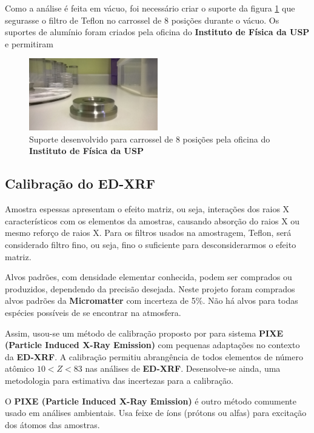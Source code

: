 Como a análise é feita em vácuo, foi necessário criar o suporte 
da figura \ref{fig:suporte8} que segurasse o filtro de Teflon no 
carrossel de 8 posições durante o vácuo. 
Os suportes de alumínio foram criados pela oficina do \textbf{Instituto de
Física da USP} e permitiram 

\begin{figure}[H]
\begin{center}
  \includegraphics[width=0.5\textwidth]{../inputs/images/suporte8.jpg}
  \caption{Suporte desenvolvido para carrossel de 8 posições pela oficina
           do \textbf{Instituto de Física da USP} \label{fig:suporte8}}
\end{center}
\end{figure}

\subsection{Calibração do \textbf{ED-XRF}}

Amostra espessas apresentam o efeito matriz, ou seja, interações dos 
raios X característicos com os elementos da amostras, causando 
absorção do raios X ou mesmo reforço de raios X. 
Para os filtros usados na amostragem, Teflon, será considerado filtro
fino, ou seja, fino o suficiente para desconsiderarmos o efeito matriz.

Alvos padrões, com densidade elementar conhecida, podem ser 
comprados ou produzidos, dependendo da precisão desejada.
Neste projeto foram comprados alvos padrões da \textbf{Micromatter}
com incerteza de 5\%. 
Não há alvos para todas espécies possíveis de se encontrar na atmosfera. 

Assim, usou-se um método de calibração proposto por \citep{tabacniks2000}
para sistema \textbf{PIXE (Particle Induced X-Ray Emission)} com pequenas
adaptações no contexto da \textbf{ED-XRF}.   
A calibração permitiu abrangência de todos elementos de número atômico 
$ 10 < Z < 83$ nas análises de \textbf{ED-XRF}. 
Desensolve-se ainda, uma metodologia para estimativa das incertezas
para a calibração.   

O \textbf{PIXE (Particle Induced X-Ray Emission)} é
outro método comumente usado em análises ambientais. 
Usa feixe de íons (prótons ou alfas) para excitação dos 
átomos das amostras.

